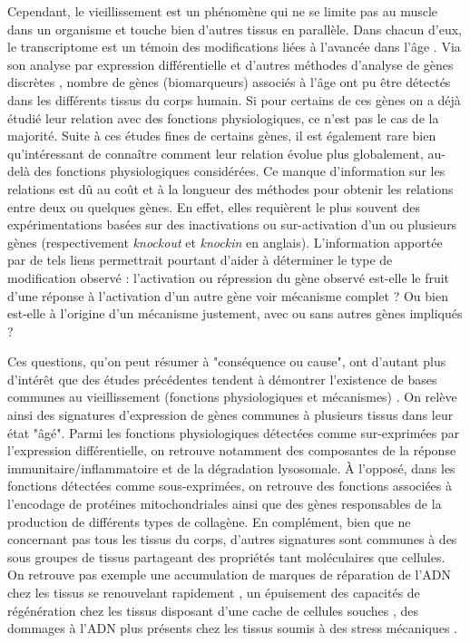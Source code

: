 Cependant, le vieillissement est un phénomène qui ne se limite pas au muscle dans un organisme et touche bien d'autres tissus en parallèle. Dans chacun d'eux, le transcriptome est un témoin des modifications liées à l'avancée dans l'âge . Via son analyse par expression différentielle et d'autres méthodes d'analyse de gènes discrètes , nombre de gènes (biomarqueurs) associés à l'âge ont pu être détectés dans les différents tissus du corps humain. 
Si pour certains de ces gènes on a déjà étudié leur relation avec des fonctions physiologiques, ce n'est pas le cas de la majorité. Suite à ces études fines de certains gènes, il est également rare bien qu'intéressant de connaître comment leur relation évolue plus globalement, au-delà des fonctions physiologiques considérées.
Ce manque d'information sur les relations est dû au coût et à la longueur des méthodes pour obtenir les relations entre deux ou quelques gènes. En effet, elles requièrent le plus souvent des expérimentations basées sur des inactivations ou sur-activation d'un ou plusieurs gènes (respectivement \textit{knockout} et \textit{knockin} en anglais). 
L'information apportée par de tels liens permettrait pourtant d'aider à déterminer le type de modification observé  : l'activation ou répression du gène observé est-elle le fruit d'une réponse à l'activation d'un autre gène voir mécanisme  complet ? Ou bien est-elle à l'origine d'un mécanisme justement, avec ou sans autres gènes impliqués ? 

Ces questions, qu'on peut résumer à "conséquence ou cause", ont d'autant plus d'intérêt que des études précédentes tendent à démontrer l'existence de bases communes au vieillissement (fonctions physiologiques et mécanismes) . On relève ainsi des signatures d'expression de gènes communes à plusieurs tissus dans leur état "âgé". Parmi les fonctions physiologiques détectées comme sur-exprimées par l'expression différentielle, on retrouve notamment des composantes de la réponse immunitaire/inflammatoire et de la dégradation lysosomale. À l'opposé, dans les fonctions détectées comme sous-exprimées, on retrouve des fonctions associées à l'encodage de protéines mitochondriales ainsi que des gènes responsables de la production de différents types de collagène. En complément, bien que ne concernant pas tous les tissus du corps, d'autres signatures sont communes à des sous groupes de tissus partageant des propriétés tant moléculaires que cellules. On retrouve pas exemple une accumulation de marques de réparation de l'ADN chez les tissus se renouvelant rapidement , un épuisement des capacités de régénération chez les tissus disposant d'une cache de cellules souches , des dommages à l'ADN plus présents chez les tissus soumis à des stress mécaniques .

